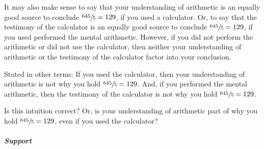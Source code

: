 \begin{note}
  It may also make sense to say that your understanding of arithmetic is an equally good source to conclude \(\sfrac{645}{5} = 129\), if you used a calculator.
  Or, to say that the testimony of the calculator is an equally good source to conclude \(\sfrac{645}{5} = 129\), if you used performed the mental arithmetic.
  However, if you did not perform the arithmetic or did not use the calculator, then neither your understanding of arithmetic or the testimony of the calculator factor into your conclusion.

  Stated in other terms:
  If you used the calculator, then your understanding of arithmetic is not why you hold \(\sfrac{645}{5} = 129\).
  And, if you performed the mental arithmetic, then the testimony of the calculator is not why you hold \(\sfrac{645}{5} = 129\).

  Is this intuition correct?
  Or, is your understanding of arithmetic part of why you hold \(\sfrac{645}{5} = 129\), even if you used the calculator?
\end{note}

\subparagraph*{Support}

